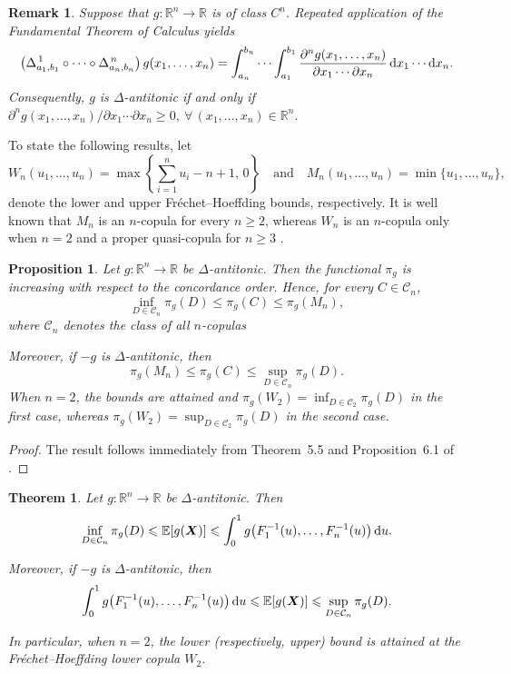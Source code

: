 \documentclass[12pt]{article}
\newtheorem{remark}[theo]{Remark}%
\newtheorem{proposition}[theo]{Proposition}%
\newtheorem{theorem}{Theorem}
\begin{document}
\begin{remark}\label{rem-antitonic}
	Suppose that
	$g:\mathbb R^n\to\mathbb R$
	is of class
	$C^n$.
	Repeated application of the Fundamental Theorem of Calculus yields
	\[
	\left(
	\Delta^{\,1}_{a_1,b_1}
	\circ
	\cdots
	\circ
	\Delta^{\,n}_{a_n,b_n}
	\right)
	g(x_1,\ldots,x_n)
	=
	\int_{a_n}^{b_n}
	\cdots
	\int_{a_1}^{b_1}
	\frac{\partial^n g(x_1,\ldots,x_n)}
	{\partial x_1\cdots\partial x_n}
	\,{\rm d}x_1
	\cdots
	{\rm d}x_n.
	\]
	Consequently,
	$g$
	is
	$\Delta$-antitonic
	if and only if
	$
	{\partial^n g(x_1,\ldots,x_n)}/
	{\partial x_1\cdots\partial x_n}
	\geqslant0,
	\
	\forall\,
	(x_1,\ldots,x_n)\in\mathbb R^n.
	$
\end{remark}



To state the following results, let
\[
W_n(u_1,\ldots,u_n)
=
\max\!\left\{
\sum_{i=1}^{n}u_i-n+1,\,
0
\right\}
\quad
\text{and}
\quad
M_n(u_1,\ldots,u_n)
=
\min\{u_1,\ldots,u_n\},
\]
denote the lower and upper Fréchet--Hoeffding bounds, respectively.
It is well known that
$M_n$
is an $n$-copula for every
$n\geqslant2$,
whereas
$W_n$
is an $n$-copula only when
$n=2$
and a proper quasi-copula for
$n\geqslant3$
\citep{Genest1999}.



\begin{proposition}\label{antitonic}
	Let
	$g:\mathbb R^n\to\mathbb R$
	be
	$\Delta$-antitonic.
	Then the functional
	$\pi_g$
	is increasing with respect to the concordance order. Hence, for every
	$C\in\mathcal C_n$,
	\[
	\inf_{D\in\mathcal C_n}\pi_g(D)
	\leqslant
	\pi_g(C)
	\leqslant
	\pi_g(M_n),
	\]
	where $\mathcal C_n$ denotes the class of all $n$-copulas 
	
	Moreover, if
	$-g$
	is
	$\Delta$-antitonic,
	then
	\[
	\pi_g(M_n)
	\leqslant
	\pi_g(C)
	\leqslant
	\sup_{D\in\mathcal C_n}\pi_g(D).
	\]
	When $n=2$, the bounds are attained and
	$
	\pi_g(W_2)
	=
	\inf_{D\in\mathcal C_2}\pi_g(D)
	$
	in the first case, whereas
	$
	\pi_g(W_2)
	=
	\sup_{D\in\mathcal C_2}\pi_g(D)
	$
	in the second case.
\end{proposition}
\begin{proof}
	The result follows immediately from
	Theorem~5.5 and Proposition~6.1 of
	\cite{Lux2017}.
\end{proof}


\begin{theorem}\label{main-result-multivariate}
	Let
	$g:\mathbb R^n\to\mathbb R$
	be
	$\Delta$-antitonic.
	Then
	\[
	\inf_{D\in\mathcal C_n}\pi_g(D)
	\leqslant
	\mathbb E[g(\boldsymbol X)]
	\leqslant
	\int_0^1
	g\!\left(
	F_1^{-1}(u),
	\ldots,
	F_n^{-1}(u)
	\right)
	{\rm d}u.
	\]
	
	Moreover, if
	$-g$
	is
	$\Delta$-antitonic,
	then
	\[
	\int_0^1
	g\!\left(
	F_1^{-1}(u),
	\ldots,
	F_n^{-1}(u)
	\right)
	{\rm d}u
	\leqslant
	\mathbb E[g(\boldsymbol X)]
	\leqslant
	\sup_{D\in\mathcal C_n}\pi_g(D).
	\]
	
	In particular, when $n=2$, the lower (respectively, upper) bound is attained at the Fréchet--Hoeffding lower copula $W_2$.
\end{theorem}
\end{document}
